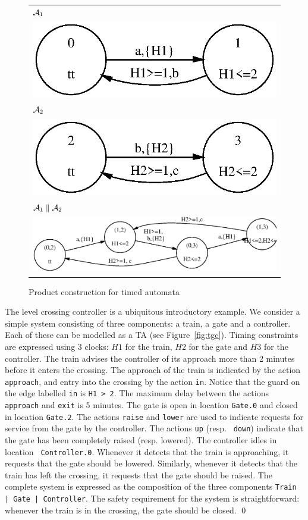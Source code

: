 {\begin{figure}
\begin{center}
\begin{tabular}{|c|}
\hline
\multicolumn{1}{|l|}{$\AA_1$} \\
\includegraphics[width=.3\linewidth]{METHODS/a1.eps} \\
\hline
\multicolumn{1}{|l|}{$\AA_2$} \\
\includegraphics[width=.3\linewidth]{METHODS/a2.eps} \\
\hline
\multicolumn{1}{|l|}{$\AA_1 \parallel \AA_2$} \\
\includegraphics[width=.7\linewidth]{METHODS/a1compa2.eps} \\
\hline
\end{tabular}
\end{center}
\caption{Product construction for timed automata\label{fig:ex2}}
\end{figure}

\begin{exampleb}
The level crossing controller is a ubiquitous introductory example.
We consider a simple system consisting of three components: a train, a
gate and a controller. Each of these can be modelled as a TA (see
Figure~\ref{fig:tgc}). Timing constraints are expressed using 3
clocks: $H1$ for the train, $H2$ for the gate and $H3$ for the
controller. The train advises the controller of its approach more than
2 minutes before it enters the crossing.  The approach of the train is
indicated by the action {\tt approach}, and entry into the
crossing by the action {\tt in}. Notice that the guard on the edge
labelled {\tt in} is {\tt H1 > 2}. The maximum delay between the
actions {\tt approach} and {\tt exit} is 5 minutes. The gate is open in
location {\tt Gate.0} and closed in location {\tt Gate.2}. The actions
{\tt raise} and {\tt lower} are used to indicate requests for service
from the gate by the controller.  The actions {\tt up} (resp. {\tt
down}) indicate that the gate has been completely raised
(resp. lowered). The controller idles in location {\tt
Controller.0}. Whenever it detects that the train is approaching, it
requests that the gate should be lowered. Similarly, whenever it
detects that the train has left the crossing, it requests that the
gate should be raised. The complete system is expressed as the
composition of the three components {\tt Train | Gate | Controller}.
The safety requirement for the system is straightforward: whenever the
train is in the crossing, the gate should be closed.
\qed
\end{exampleb}

}
